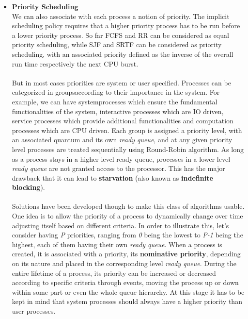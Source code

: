 \documentclass[11pt,a4paper]{scrreprt}
\begin{document}
\begin{itemize}
\item \textbf{Priority Scheduling} \\
We can also associate with each process a notion of priority. The implicit scheduling policy requires that a higher priority process has to be run before a lower priority process. So far FCFS and RR can be considered as equal priority scheduling, while SJF and SRTF can be considered as priority scheduling, with an associated priority defined as the inverse of the overall run time respectively the next CPU burst. \\\\
But in most cases priorities are system or user specified. Processes can be categorized in groupsaccording to their importance in the system. For example, we can have systemprocesses which ensure the fundamental functionalities of the system, interactive processes which are IO driven, service processes which provide additional functionalities and computation processes which are CPU driven. Each group is assigned a priority level, with an associated quantum and its own \textit{ready queue}, and at any given priority level processes are treated sequentially using Round-Robin algorithm. As long as a process stays in a higher level ready queue, processes in a lower level \textit{ready queue} are not granted access to the processor. This has the major drawback that it can lead to \textbf{starvation} (also known as \textbf{indefinite blocking}). \\\\
Solutions have been developed though to make this class of algorithms usable. One idea is to allow the priority of a process to dynamically change over time adjusting itself based on different criteria. In order to illustrate this, let’s consider having \textit{P} priorities, ranging from \textit{0} being the lowest to \textit{P-1} being the highest, each of them having their own \textit{ready queue}. When a process is created, it is associated with a priority, its \textbf{nominative priority}, depending on its nature and placed in the corresponding level \textit{ready queue}. During the entire lifetime of a process, its priority can be increased or decreased according to specific criteria through events, moving the process up or down within some part or even the whole queue hierarchy. At this stage it has to be kept in mind that system processes should always have a higher priority than user processes. \\\\

\end{itemize}
\end{document}
